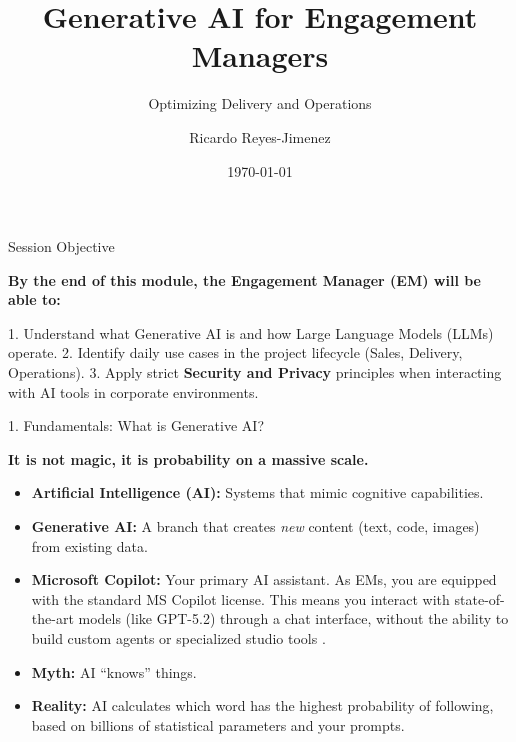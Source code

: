 \documentclass[aspectratio=169]{beamer}
\title[Generative AI for Engagement M]{Generative AI for Engagement Managers}
\subtitle{Optimizing Delivery and Operations}
\author{Ricardo Reyes-Jimenez}
\institute{Capgemini}
\date{\today}
\begin{document}
\begin{frame}
  \titlepage
\end{frame}

\usebackgroundtemplate{}



\begin{frame}[fragile]{Session Objective}

\textbf{By the end of this module, the Engagement Manager (EM) will be able to:}

1. Understand what Generative AI is and how Large Language Models (LLMs) operate.
2. Identify daily use cases in the project lifecycle (Sales, Delivery, Operations).
3. Apply strict \textbf{Security and Privacy} principles when interacting with AI tools in corporate environments.

\end{frame}



\begin{frame}[fragile]{1. Fundamentals: What is Generative AI?}


\textbf{It is not magic, it is probability on a massive scale.}

\begin{itemize}
  \item \textbf{Artificial Intelligence (AI):} Systems that mimic cognitive capabilities.
  \item \textbf{Generative AI:} A branch that creates \textit{new} content (text, code, images) from existing data.
  \item \textbf{Microsoft Copilot:} Your primary AI assistant. As EMs, you are equipped with the standard MS Copilot license. This means you interact with state-of-the-art models (like GPT-5.2) through a chat interface, without the ability to build custom agents or specialized studio tools \cite{copilot2025}.
  \item \textbf{Myth:} AI ``knows'' things.
  \item \textbf{Reality:} AI calculates which word has the highest probability of following, based on billions of statistical parameters and your prompts.
\end{itemize}
\end{frame}
\end{document}
